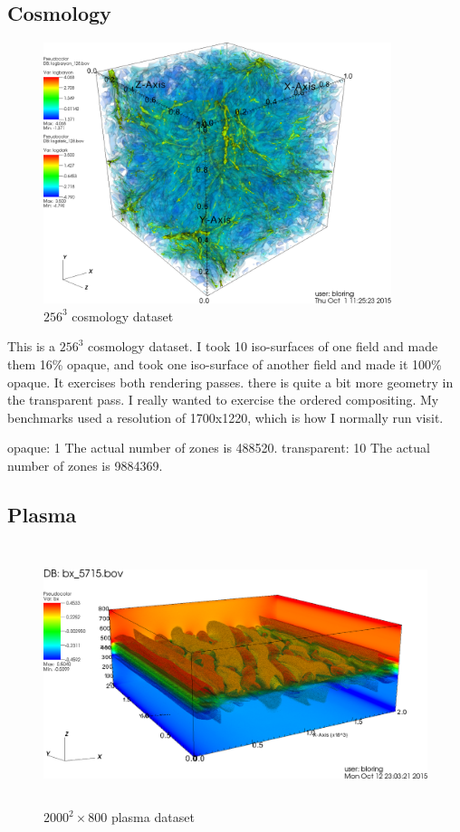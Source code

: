 \documentclass[a4paper,10pt]{report}
\begin{document}
\subsection{Cosmology}
\begin{figure}[ht]
 \centering
 \includegraphics[height=3.0in]{./cosmology_test_case_0080.png}
 \caption{$256^3$ cosmology dataset}
 \label{fig:cosmo_data}
\end{figure}
This is a $256^3$ cosmology dataset. I took 10 iso-surfaces of one field and made them 16\% opaque, and took one iso-surface of another field and made it 100\% opaque. It exercises both rendering passes. there is quite a bit more geometry in the transparent pass. I really wanted to exercise the ordered compositing. My benchmarks used a resolution of 1700x1220, which is how I normally run visit.


opaque: 1
The actual number of zones is 488520.
transparent: 10
The actual number of zones is 9884369.

\subsection{Plasma}
\begin{figure}[ht]
 \centering
 \includegraphics[height=3.0in]{./vpic_test_case_0030.png}
 \caption{$2000^2 \times 800$ plasma dataset}
 \label{fig:vpic_data}
\end{figure}
\end{document}

